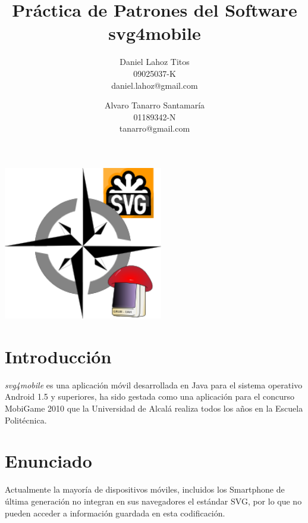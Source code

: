 \documentclass[a4paper,10pt]{article}
\begin{document}
\title{Práctica de Patrones del Software\\svg4mobile}

\author{Daniel Lahoz Titos\\09025037-K\\daniel.lahoz@gmail.com
\and Alvaro Tanarro Santamar\'ia\\01189342-N\\tanarro@gmail.com}

\maketitle

\begin{center}
 \includegraphics[height=6.7cm]{logo.png}
\end{center}

\clearpage

\tableofcontents

\clearpage

\section{Introducción}
\textit{svg4mobile} es una aplicación móvil desarrollada en Java para el sistema operativo Android 1.5 y superiores, ha sido gestada como una aplicación para el concurso MobiGame 2010 que la Universidad de Alcalá realiza todos los años en la Escuela Politécnica.

\section{Enunciado}
Actualmente la mayoría de dispositivos móviles, incluidos los Smartphone de última generación no integran en sus navegadores el estándar SVG, por lo que no pueden acceder a información guardada en esta codificación.
\end{document}
